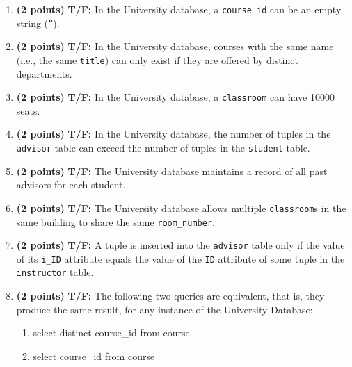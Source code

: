 \documentclass{article}
\begin{document}
\begin{enumerate}
  \item \textbf{(2 points)} \textbf{T/F:} In the University database, a \texttt{course\_id} can be an empty string (\texttt{''}).
  \item \textbf{(2 points)} \textbf{T/F:} In the University database, courses with the same name (i.e., the same \texttt{title}) can only exist if they are offered by distinct departments.
  \item \textbf{(2 points)} \textbf{T/F:} In the University database, a \texttt{classroom} can have 10000 seats.
  \item \textbf{(2 points)} \textbf{T/F:} In the University database, the number of tuples in the \texttt{advisor} table can exceed the number of tuples in the \texttt{student} table.
  \item \textbf{(2 points)} \textbf{T/F:} The University database maintains a record of all past advisors for each student.
  \item \textbf{(2 points)} \textbf{T/F:} The University database allows multiple \texttt{classroom}s in the same building to share the same \texttt{room\_number}.
  \item \textbf{(2 points)} \textbf{T/F:} A tuple is inserted into the \texttt{advisor} table only if the value of its \texttt{i\_ID} attribute equals the value of the \texttt{ID} attribute of some tuple in the \texttt{instructor} table.
  \item \textbf{(2 points)} \textbf{T/F:} The following two queries are equivalent, that is, they produce the same result, for any instance of the University Database:
  \begin{enumerate}
    \item select distinct course\_id from course
    \item select course\_id from course
  \end{enumerate}
\end{enumerate}
\end{document}
